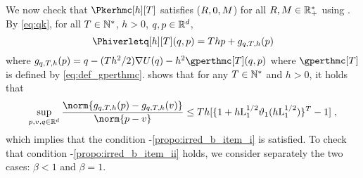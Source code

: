 We now check that $\Pkerhmc[h][T]$ satisfies ($R,0,M$) for all $R,M \in
\mathbb{R}_+^*$ using .  By \eqref{eq:qk}, for all $T \in \mathbb{N}^{*}$, $h >0$, $q,p \in \mathbb{R}^d$,
\begin{equation}
  \label{eq:phiverlet_gqth}
  \Phiverletq[h][T](q,p) = T
h p + g_{q,T,h}(p)
\end{equation}
where $g_{q,T,h}(p) = q - (Th^2/2) \nabla \F(q) -
h^2 \gperthmc[T](q,p)$ where $\gperthmc[T]$ is defined by \eqref{eq:def_gperthmc}.  shows that for any $T \in \mathbb{N}^{*}$ and $h >0$, it holds that
\begin{equation}
    \label{eq:2:theo:irred_D}
\sup_{p,v,q \in  \rset^d} \frac{\norm{g_{q,T,h}(p)-g_{q,T,h}(v)}}{\norm{p - v}} \leq T h [\{1 + h \constzero^{1/2} \vartheta_1(h \constzero^{1/2} )\}^T-1] \eqsp,
\end{equation}
which implies that the condition
-\ref{propo:irred_b_item_i} is satisfied. To check that
condition  -\ref{propo:irred_b_item_ii} holds, we consider separately the two cases: $\beta <1$ and $\beta =1$.

